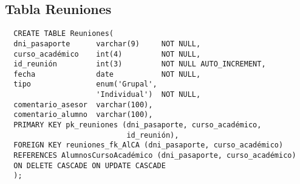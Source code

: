 \subsection{Tabla Reuniones}

\begin{verbatim}
  CREATE TABLE Reuniones(
  dni_pasaporte      varchar(9)     NOT NULL,
  curso_académico    int(4)         NOT NULL,
  id_reunión         int(3)         NOT NULL AUTO_INCREMENT,
  fecha              date           NOT NULL,
  tipo               enum('Grupal',
                     'Individual')  NOT NULL,
  comentario_asesor  varchar(100),
  comentario_alumno  varchar(100),
  PRIMARY KEY pk_reuniones (dni_pasaporte, curso_académico,
                            id_reunión),
  FOREIGN KEY reuniones_fk_AlCA (dni_pasaporte, curso_académico)
  REFERENCES AlumnosCursoAcadémico (dni_pasaporte, curso_académico)
  ON DELETE CASCADE ON UPDATE CASCADE
  );
\end{verbatim}